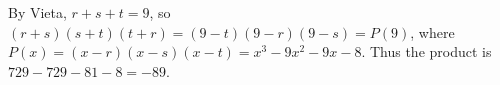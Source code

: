 By Vieta, $r+s+t=9$, so $(r+s)(s+t)(t+r)=(9-t)(9-r)(9-s)=P(9)$, where $P(x)=(x-r)(x-s)(x-t)=x^3-9x^2-9x-8$. Thus the product is $729-729-81-8=\boxed{-89}$.
